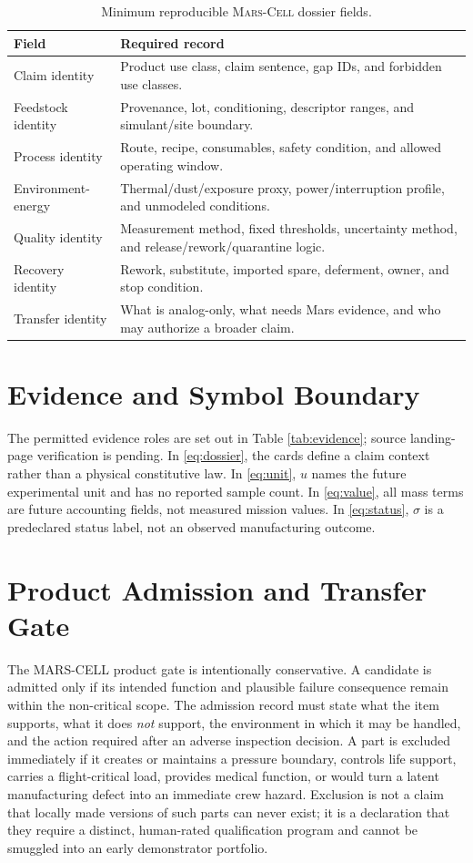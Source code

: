 \documentclass[conference]{../../../../Conference-LaTeX-template_10-17-19/IEEEtran}
\newcommand{\marscell}{\textsc{Mars-Cell}}
\begin{document}
\begin{table}[!t]
\caption{Minimum reproducible \marscell{} dossier fields.}
\label{tab:schema}
\centering
\footnotesize
\begin{tabularx}{\columnwidth}{lY}
\toprule
Field & Required record \\
\midrule
Claim identity & Product use class, claim sentence, gap IDs, and forbidden use classes. \\
Feedstock identity & Provenance, lot, conditioning, descriptor ranges, and simulant/site boundary. \\
Process identity & Route, recipe, consumables, safety condition, and allowed operating window. \\
Environment-energy & Thermal/dust/exposure proxy, power/interruption profile, and unmodeled conditions. \\
Quality identity & Measurement method, fixed thresholds, uncertainty method, and release/rework/quarantine logic. \\
Recovery identity & Rework, substitute, imported spare, deferment, owner, and stop condition. \\
Transfer identity & What is analog-only, what needs Mars evidence, and who may authorize a broader claim. \\
\bottomrule
\end{tabularx}
\end{table}

\section{Evidence and Symbol Boundary}
The permitted evidence roles are set out in Table \ref{tab:evidence}; source landing-page verification is pending. In \eqref{eq:dossier}, the cards define a claim context rather than a physical constitutive law. In \eqref{eq:unit}, $u$ names the future experimental unit and has no reported sample count. In \eqref{eq:value}, all mass terms are future accounting fields, not measured mission values. In \eqref{eq:status}, $\sigma$ is a predeclared status label, not an observed manufacturing outcome.

\section{Product Admission and Transfer Gate}
The MARS-CELL product gate is intentionally conservative. A candidate is admitted only if its intended function and plausible failure consequence remain within the non-critical scope. The admission record must state what the item supports, what it does \emph{not} support, the environment in which it may be handled, and the action required after an adverse inspection decision. A part is excluded immediately if it creates or maintains a pressure boundary, controls life support, carries a flight-critical load, provides medical function, or would turn a latent manufacturing defect into an immediate crew hazard. Exclusion is not a claim that locally made versions of such parts can never exist; it is a declaration that they require a distinct, human-rated qualification program and cannot be smuggled into an early demonstrator portfolio.
\end{document}
